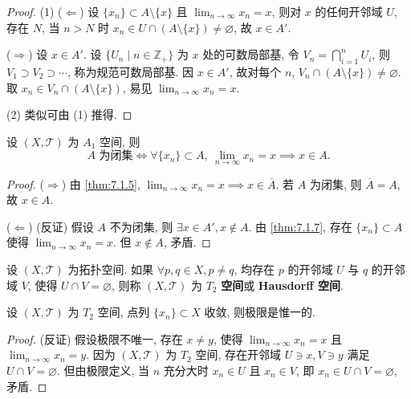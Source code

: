 \begin{proof}
(1) ($\Leftarrow$) 设 $\{x_n\} \subset A \setminus \{x\}$ 且 $\lim_{n \to \infty} x_n = x$, 则对 $x$ 的任何开邻域 $U$, 存在 $N$, 当 $n > N$ 时 $x_n \in U \cap (A \setminus \{x\}) \neq \varnothing$, 故 $x \in A'$.

($\Rightarrow$) 设 $x \in A'$. 设 $\{U_n \mid n \in \mathbb{Z}_+\}$ 为 $x$ 处的可数局部基, 令 $V_n = \bigcap_{i=1}^n U_i$, 则 $V_1 \supset V_2 \supset \cdots$, 称为规范可数局部基. 因 $x \in A'$, 故对每个 $n$, $V_n \cap (A \setminus \{x\}) \neq \varnothing$. 取 $x_n \in V_n \cap (A \setminus \{x\})$, 易见 $\lim_{n \to \infty} x_n = x$.

(2) 类似可由 (1) 推得. \qedhere
\end{proof}

\begin{theorem}\label{thm:7.1.8}
设 $(X, \mathcal{T})$ 为 $A_1$ 空间, 则
\[
  A \text{ 为闭集} \iff \forall \{x_n\} \subset A,\ \lim_{n \to \infty} x_n = x \implies x \in A.
\]
\end{theorem}

\begin{proof}
($\Rightarrow$) 由 \cref{thm:7.1.5}, $\lim_{n \to \infty} x_n = x \implies x \in \overline{A}$. 若 $A$ 为闭集, 则 $\overline{A} = A$, 故 $x \in A$.

($\Leftarrow$) (反证) 假设 $A$ 不为闭集, 则 $\exists x \in A', x \notin A$. 由 \cref{thm:7.1.7}, 存在 $\{x_n\} \subset A$ 使得 $\lim_{n \to \infty} x_n = x$. 但 $x \notin A$, 矛盾. \qedhere
\end{proof}

\begin{definition}\label{def:7.1.6}
设 $(X, \mathcal{T})$ 为拓扑空间. 如果 $\forall p, q \in X, p \neq q$, 均存在 $p$ 的开邻域 $U$ 与 $q$ 的开邻域 $V$, 使得 $U \cap V = \varnothing$, 则称 $(X, \mathcal{T})$ 为 $T_2$ \textbf{空间}或 \textbf{Hausdorff 空间}.
\end{definition}

\begin{theorem}\label{thm:7.1.9}
设 $(X, \mathcal{T})$ 为 $T_2$ 空间, 点列 $\{x_n\} \subset X$ 收敛, 则极限是惟一的.
\end{theorem}

\begin{proof}
(反证) 假设极限不唯一, 存在 $x \neq y$, 使得 $\lim_{n \to \infty} x_n = x$ 且 $\lim_{n \to \infty} x_n = y$. 因为 $(X, \mathcal{T})$ 为 $T_2$ 空间, 存在开邻域 $U \ni x, V \ni y$ 满足 $U \cap V = \varnothing$. 但由极限定义, 当 $n$ 充分大时 $x_n \in U$ 且 $x_n \in V$, 即 $x_n \in U \cap V = \varnothing$, 矛盾. \qedhere
\end{proof}

